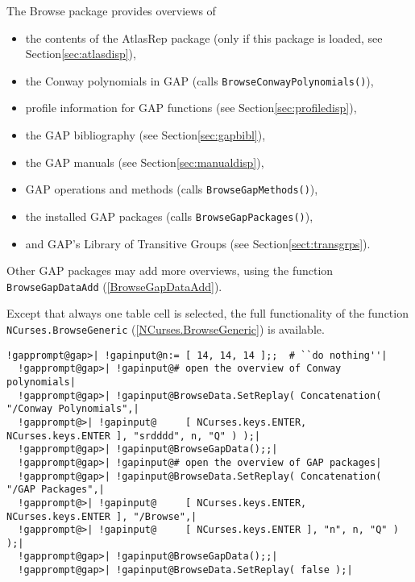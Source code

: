 \documentclass[a4paper,11pt]{report}
\begin{document}
{{{ The \textsf{Browse} package provides overviews of 
\begin{itemize}
\item  the contents of the \textsf{AtlasRep} package (only if this package is loaded, see Section{\nobreakspace}\ref{sec:atlasdisp}), 
\item  {} the Conway polynomials in \textsf{GAP} (calls \texttt{BrowseConwayPolynomials()}), 
\item  profile information for \textsf{GAP} functions (see Section{\nobreakspace}\ref{sec:profiledisp}), 
\item  the \textsf{GAP} bibliography (see Section{\nobreakspace}\ref{sec:gapbibl}), 
\item  the \textsf{GAP} manuals (see Section{\nobreakspace}\ref{sec:manualdisp}), 
\item  {} \textsf{GAP} operations and methods (calls \texttt{BrowseGapMethods()}), 
\item  {} the installed \textsf{GAP} packages (calls \texttt{BrowseGapPackages()}), 
\item  and \textsf{GAP}'s Library of Transitive Groups (see Section{\nobreakspace}\ref{sect:transgrps}). 
\end{itemize}
 

 Other \textsf{GAP} packages may add more overviews, using the function \texttt{BrowseGapDataAdd} (\ref{BrowseGapDataAdd}).   

 Except that always one table cell is selected, the full functionality of the
function \texttt{NCurses.BrowseGeneric} (\ref{NCurses.BrowseGeneric}) is available. 

 
\begin{Verbatim}[commandchars=!@|,fontsize=\small,frame=single,label=Example]
  !gapprompt@gap>| !gapinput@n:= [ 14, 14, 14 ];;  # ``do nothing''|
  !gapprompt@gap>| !gapinput@# open the overview of Conway polynomials|
  !gapprompt@gap>| !gapinput@BrowseData.SetReplay( Concatenation( "/Conway Polynomials",|
  !gapprompt@>| !gapinput@     [ NCurses.keys.ENTER, NCurses.keys.ENTER ], "srdddd", n, "Q" ) );|
  !gapprompt@gap>| !gapinput@BrowseGapData();;|
  !gapprompt@gap>| !gapinput@# open the overview of GAP packages|
  !gapprompt@gap>| !gapinput@BrowseData.SetReplay( Concatenation( "/GAP Packages",|
  !gapprompt@>| !gapinput@     [ NCurses.keys.ENTER, NCurses.keys.ENTER ], "/Browse",|
  !gapprompt@>| !gapinput@     [ NCurses.keys.ENTER ], "n", n, "Q" ) );|
  !gapprompt@gap>| !gapinput@BrowseGapData();;|
  !gapprompt@gap>| !gapinput@BrowseData.SetReplay( false );|
\end{Verbatim}
 

}}}
\end{document}
